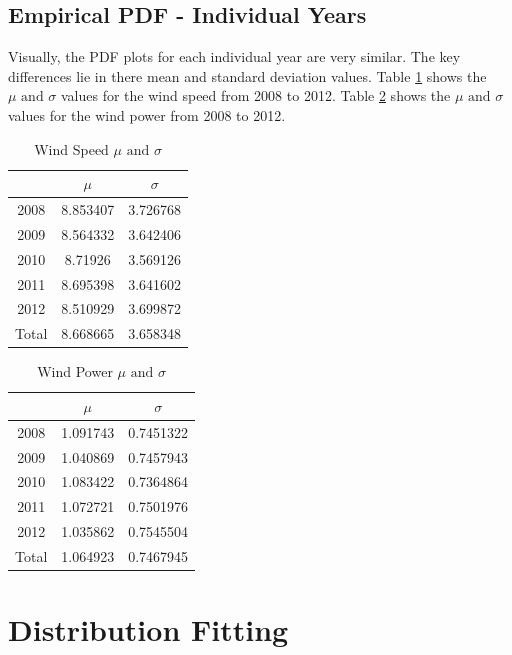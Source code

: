 \documentclass{IEEEtran}
\begin{document}
  \subsection{Empirical PDF - Individual Years}

  Visually, the PDF plots for each individual year are very similar. The key differences lie in there mean and standard deviation values. Table \ref{tab:tab2} shows the $ \mu \text{ and } \sigma $ values for the wind speed from 2008 to 2012. Table \ref{tab:tab3} shows the $ \mu \text{ and } \sigma $ values for the wind power from 2008 to 2012.

  \begin{table}
    \centering
    \caption{Wind Speed $ \mu \text{ and } \sigma $}
    \label{tab:tab2}
    \begin{tabular}{c c c}
      & $ \mu $ & $ \sigma $ \\
      \hline
      2008 & 8.853407 & 3.726768 \\
      2009 & 8.564332 & 3.642406 \\
      2010 & 8.71926 & 3.569126 \\
      2011 & 8.695398 & 3.641602 \\
      2012 & 8.510929 & 3.699872 \\
      Total & 8.668665 & 3.658348 \\
    \end{tabular}

  \end{table}

  \begin{table}
    \centering
    \caption{Wind Power $ \mu \text{ and } \sigma $}
    \label{tab:tab3}
    \begin{tabular}{c c c}
      & $ \mu $ & $ \sigma $ \\
      \hline
      2008 & 1.091743 & 0.7451322 \\
      2009 & 1.040869 & 0.7457943 \\
      2010 & 1.083422 & 0.7364864 \\
      2011 & 1.072721 & 0.7501976 \\
      2012 & 1.035862 & 0.7545504 \\
      Total & 1.064923 & 0.7467945 \\
    \end{tabular}

  \end{table}


  \section{Distribution Fitting}
\end{document}
